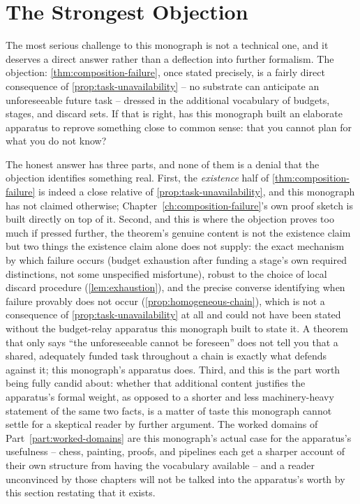 \section{The Strongest Objection}

The most serious challenge to this monograph is not a technical one, and
it deserves a direct answer rather than a deflection into further
formalism. The objection: \cref{thm:composition-failure}, once stated
precisely, is a fairly direct consequence of
\cref{prop:task-unavailability} -- no substrate can anticipate an
unforeseeable future task -- dressed in the additional vocabulary of
budgets, stages, and discard sets. If that is right, has this monograph
built an elaborate apparatus to reprove something close to common sense:
that you cannot plan for what you do not know?

The honest answer has three parts, and none of them is a denial that
the objection identifies something real. First, the \emph{existence}
half of \cref{thm:composition-failure} is indeed a close relative of
\cref{prop:task-unavailability}, and this monograph has not claimed
otherwise; Chapter~\ref{ch:composition-failure}'s own proof sketch is
built directly on top of it. Second, and this is where the objection
proves too much if pressed further, the theorem's genuine content is not
the existence claim but two things the existence claim alone does not
supply: the exact mechanism by which failure occurs (budget exhaustion
after funding a stage's own required distinctions, not some
unspecified misfortune), robust to the choice of local discard procedure
(\cref{lem:exhaustion}), and the precise converse identifying when
failure provably does not occur (\cref{prop:homogeneous-chain}), which
is not a consequence of \cref{prop:task-unavailability} at all and could
not have been stated without the budget-relay apparatus this monograph
built to state it. A theorem that only says ``the unforeseeable cannot
be foreseen'' does not tell you that a shared, adequately funded task
throughout a chain is exactly what defends against it; this monograph's
apparatus does. Third, and this is the part worth being fully candid
about: whether that additional content justifies the apparatus's
formal weight, as opposed to a shorter and less machinery-heavy
statement of the same two facts, is a matter of taste this monograph
cannot settle for a skeptical reader by further argument. The worked
domains of Part~\ref{part:worked-domains} are this monograph's actual
case for the apparatus's usefulness -- chess, painting, proofs, and
pipelines each get a sharper account of their own structure from having
the vocabulary available -- and a reader unconvinced by those chapters
will not be talked into the apparatus's worth by this section restating
that it exists.

